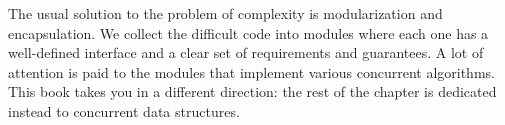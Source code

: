 The usual solution to the problem of complexity is modularization and encapsulation. We collect the difficult code into modules where each one has a well-defined interface and a clear set of requirements and guarantees. A lot of attention is paid to the modules that implement various concurrent algorithms. This book takes you in a different direction: the rest of the chapter is dedicated instead to concurrent data structures.




































